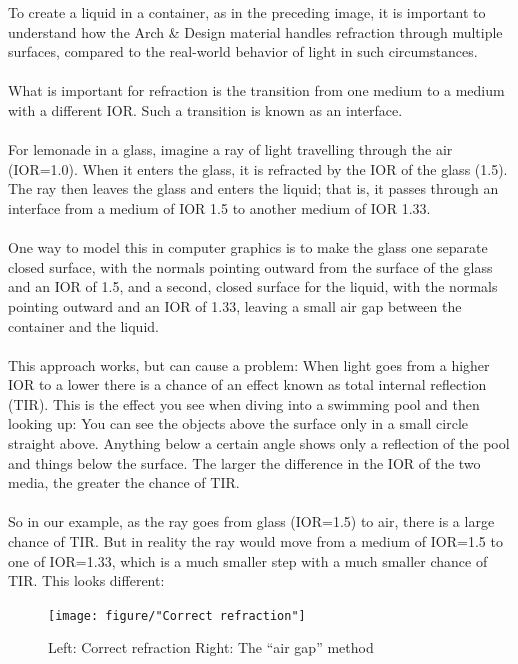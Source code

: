 \documentclass[10pt,a4paper]{article}
\begin{document}
To create a liquid in a container, as in the preceding image, it is important to understand how the Arch \& Design material handles refraction through multiple surfaces, compared to the real-world behavior of light in such circumstances.
\\
\\
What is important for refraction is the transition from one medium to a medium with a different IOR. Such a transition is known as an interface.
\\
\\
For lemonade in a glass, imagine a ray of light travelling through the air (IOR=1.0). When it enters the glass, it is refracted by the IOR of the glass (1.5). The ray then leaves the glass and enters the liquid; that is, it passes through an interface from a medium of IOR 1.5 to another medium of IOR 1.33.
\\
\\
One way to model this in computer graphics is to make the glass one separate closed surface, with the normals pointing outward from the surface of the glass and an IOR of 1.5, and a second, closed surface for the liquid, with the normals pointing outward and an IOR of 1.33, leaving a small air gap between the container and the liquid.
\\
\\
This approach works, but can cause a problem: When light goes from a higher IOR to a lower there is a chance of an effect known as total internal reflection (TIR). This is the effect you see when diving into a swimming pool and then looking up: You can see the objects above the surface only in a small circle straight above. Anything below a certain angle shows only a reflection of the pool and things below the surface. The larger the difference in the IOR of the two media, the greater the chance of TIR.
\\
\\
So in our example, as the ray goes from glass (IOR=1.5) to air, there is a large chance of TIR. But in reality the ray would move from a medium of IOR=1.5 to one of IOR=1.33, which is a much smaller step with a much smaller chance of TIR. This looks different:

\begin{figure}[tbh]
	\centering
	\texttt{[image: figure/"Correct refraction"]}
	\caption{Left: Correct refraction 		Right: The “air gap” method}
	\label{fig:left-correct-refraction-right-the-air-gap-method}
\end{figure}
\end{document}
